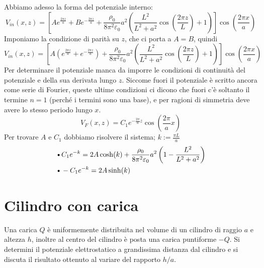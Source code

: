 Abbiamo adesso la forma del potenziale interno:
\begin{equation}
  V_{in}(x,z) = \left[ A e^{\frac{2\pi z}{a}} + B e^{-\frac{2\pi z}{a}} 
  + \frac{\rho_0}{8\pi^2 \varepsilon_0} a^2 \left( \frac{L^2}{L^2 + a^2} \cos\! \left( \frac{2\pi z}{L} \right) + 1  \right)\right]
  \cos (\frac{2\pi x}{a})
\end{equation}
Imponiamo la condizione di parità su $ z $, che ci porta a $ A = B $, quindi
\begin{equation}
  V_{in}(x,z) = \left[ A \left( e^{\frac{2\pi z}{a}} + e^{-\frac{2\pi z}{a}} \right)
  + \frac{\rho_0}{8\pi^2 \varepsilon_0} a^2 \left( \frac{L^2}{L^2 + a^2} \cos\! \left( \frac{2\pi z}{L} \right) + 1  \right)\right]
  \cos (\frac{2\pi x}{a})
\end{equation}
Per determinare il potenziale manca da imporre le condizioni di continuità del potenziale e della sua derivata lungo $ z $. Siccome fuori il potenziale è 
scritto ancora come serie di Fourier, queste ultime condizioni ci dicono che fuori c'è soltanto il termine $ n = 1 $ (perché i termini sono una base), 
e per ragioni di simmetria deve avere lo stesso periodo lungo $ x $.
\begin{equation}
  V_F (x,z) = C_1 e^{-\frac{2\pi}{a}z} \cos \left( \frac{2\pi}{a} x \right)
\end{equation}
Per trovare $ A $ e $ C_1 $ dobbiamo risolvere il sistema; $ k := \frac{\pi L}{a} $
\begin{align}
  &\text{\textbullet} C_1 e^{-k} = 2A \cosh (k) + \frac{\rho_0}{8\pi^2 \varepsilon_0} a^2 \left( 1 - \frac{L^2}{L^2 + a^2} \right)
  \\
  &\text{\textbullet} -C_1 e^{-k} = 2A \sinh(k)
\end{align}


\section{Cilindro con carica}
Una carica $ Q $ è uniformemente distribuita nel volume di un cilindro di raggio $ a $ e altezza $ h $, inoltre al centro del cilindro è posta una 
carica puntiforme $ -Q $. Si determini il potenziale elettrostatico a grandissima distanza dal cilindro e si discuta il risultato ottenuto al variare 
del rapporto $ h/a $.

